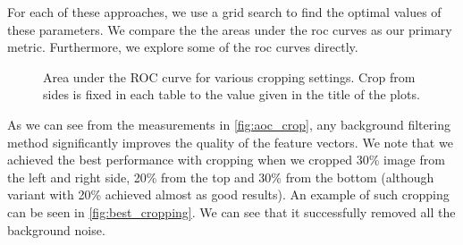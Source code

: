 For each of these approaches, we use a grid search to find the optimal values of
these parameters. We compare the the
areas under the \gls{roc} curves as our primary metric. Furthermore, we explore some of the
\gls{roc} curves directly.
\begin{figure}
    \centering
    \def\svgwidth{\columnwidth}
    \Large
    \scalebox{0.6}{}
    \scalebox{0.6}{}
    \scalebox{0.6}{}
    \caption[Area under the ROC curve for various cropping settings]{Area under the ROC curve for various cropping settings. Crop from sides is fixed in each table to the value given in the title of the plots.}
    \label{fig:aoc_crop}
\end{figure}

As we can see from the measurements in \autoref{fig:aoc_crop}, any background filtering method significantly improves the quality of the feature vectors. We note that we achieved the best performance with cropping when we 
cropped 30\% image from the left and right side, 20\% from the top and 30\%
from the bottom (although variant with 20\% achieved almost as good results). An example of such cropping can be seen in
\autoref{fig:best_cropping}. We can see that it successfully removed all the background noise.

